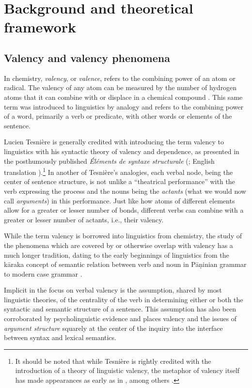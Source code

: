 \chapter{Background and theoretical framework}\label{chapter:background}
\section{Valency and valency phenomena}


In chemistry, \textit{valency}, or \textit{valence}, refers to the combining power of an atom or radical. The valency of any atom can be measured by the number of hydrogen atoms that it can combine with or displace in a chemical compound \citep{law2020a}. This same term was introduced to linguistics by analogy and refers to the combining power of a word, primarily a verb or predicate, with other words or elements of the sentence. 

Lucien Tesnière is generally credited with introducing the term valency to linguistics with his syntactic theory of valency and dependence, as presented in the posthumously published \textit{Éléments de syntaxe structurale} (\cite*{tesniere1959}; English translation \cite*{tesniere2015}).\footnote{
    It should be noted that while Tesnière is rightly credited with the introduction of a theory of linguistic valency, the metaphor of valency itself has made appearances as early as in \citet{peirce1897}, among others \citep{przepiorkowski2018}.
}
In another of Tesnière's analogies, each verbal node, being the center of sentence structure, is not unlike a ``theatrical performance'' with the verb expressing the process and the nouns being the \textit{actants} (what we would now call \textit{arguments}) in this performance. Just like how atoms of different elements allow for a greater or lesser number of bonds, different verbs can combine with a greater or lesser number of actants, i.e., their valency.

While the term valency is borrowed into linguistics from chemistry, the study of the phenomena which are covered by or otherwise overlap with valency has a much longer tradition, dating to the early beginnings of linguistics from the kāraka concept of semantic relation between verb and noun \citep{ganeri2011a} in Pāṇinian grammar to modern case grammar \citep{fillmore1968}. 

Implicit in the focus on verbal valency is the assumption, shared by most linguistic theories, of the centrality of the verb in determining either or both the syntactic and semantic structure of a sentence. This assumption has also been corroborated by psycholinguistic evidence \citep{healy1970} and places valency and the issues of \textit{argument structure} squarely at the center of the inquiry into the interface between syntax and lexical semantics.

